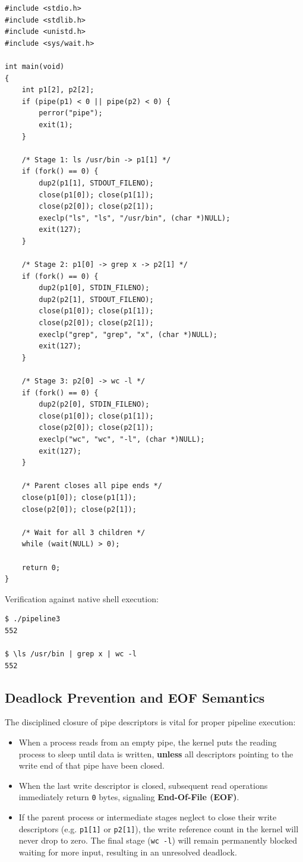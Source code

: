 \documentclass[12pt,a4paper]{article}
\begin{document}
\begin{lstlisting}[style=cstyle]
#include <stdio.h>
#include <stdlib.h>
#include <unistd.h>
#include <sys/wait.h>

int main(void)
{
    int p1[2], p2[2];
    if (pipe(p1) < 0 || pipe(p2) < 0) {
        perror("pipe");
        exit(1);
    }

    /* Stage 1: ls /usr/bin -> p1[1] */
    if (fork() == 0) {
        dup2(p1[1], STDOUT_FILENO);
        close(p1[0]); close(p1[1]);
        close(p2[0]); close(p2[1]);
        execlp("ls", "ls", "/usr/bin", (char *)NULL);
        exit(127);
    }

    /* Stage 2: p1[0] -> grep x -> p2[1] */
    if (fork() == 0) {
        dup2(p1[0], STDIN_FILENO);
        dup2(p2[1], STDOUT_FILENO);
        close(p1[0]); close(p1[1]);
        close(p2[0]); close(p2[1]);
        execlp("grep", "grep", "x", (char *)NULL);
        exit(127);
    }

    /* Stage 3: p2[0] -> wc -l */
    if (fork() == 0) {
        dup2(p2[0], STDIN_FILENO);
        close(p1[0]); close(p1[1]);
        close(p2[0]); close(p2[1]);
        execlp("wc", "wc", "-l", (char *)NULL);
        exit(127);
    }

    /* Parent closes all pipe ends */
    close(p1[0]); close(p1[1]);
    close(p2[0]); close(p2[1]);

    /* Wait for all 3 children */
    while (wait(NULL) > 0);

    return 0;
}
\end{lstlisting}

Verification against native shell execution:
\begin{lstlisting}[style=consolestyle]
$ ./pipeline3
552

$ \ls /usr/bin | grep x | wc -l
552
\end{lstlisting}

\subsection{Deadlock Prevention and EOF Semantics}
The disciplined closure of pipe descriptors is vital for proper pipeline execution:
\begin{itemize}
    \item When a process reads from an empty pipe, the kernel puts the reading process to sleep until data is written, \textbf{unless} all descriptors pointing to the write end of that pipe have been closed.
    \item When the last write descriptor is closed, subsequent read operations immediately return \texttt{0} bytes, signaling \textbf{End-Of-File (EOF)}.
    \item If the parent process or intermediate stages neglect to close their write descriptors (e.g. \texttt{p1[1]} or \texttt{p2[1]}), the write reference count in the kernel will never drop to zero. The final stage (\texttt{wc -l}) will remain permanently blocked waiting for more input, resulting in an unresolved deadlock.
\end{itemize}
\end{document}
